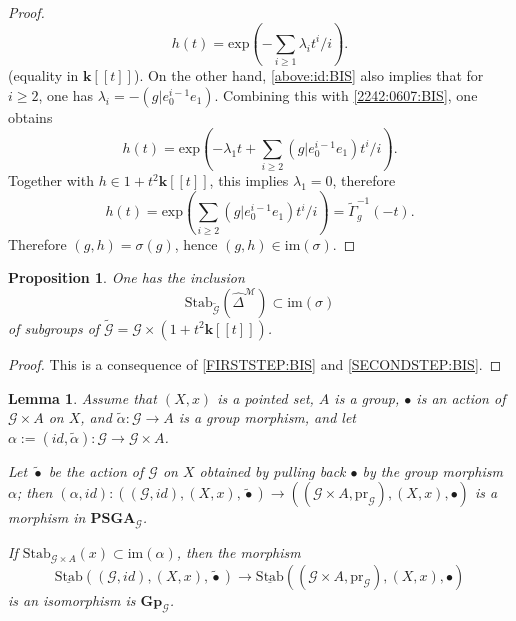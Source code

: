 \documentclass[10pt]{amsart}
\newtheorem{lem}[thm]{Lemma}
\newtheorem{prop}[thm]{Proposition}
\numberwithin{equation}{subsection}
\begin{document}
\begin{proof}
\begin{equation}\label{2242:0607:BIS}
h(t)=\mathrm{exp}(-\sum_{i\geq 1}\lambda_it^i/i). 
\end{equation}
(equality in $\mathbf k[[t]]$). On the other hand, \eqref{above:id:BIS} also implies that for $i\geq2$, one has $\lambda_i=-(g|e_0^{i-1}e_1)$. 
Combining this with \eqref{2242:0607:BIS}, one obtains  
$$
h(t)=\mathrm{exp}(-\lambda_1t+\sum_{i\geq 2}(g|e_0^{i-1}e_1)t^i/i). 
$$
Together with $h\in 1+t^2\mathbf k[[t]]$, this implies $\lambda_1=0$, therefore  
$$
h(t)=\mathrm{exp}(\sum_{i\geq 2}(g|e_0^{i-1}e_1)t^i/i)=\tilde\Gamma_g^{-1}(-t). 
$$
Therefore $(g,h)=\sigma(g)$, hence $(g,h)\in\mathrm{im}(\sigma)$. 
\end{proof}

\begin{prop}\label{prop:incl:1510}
One has the inclusion 
$$
\mathrm{Stab}_{\tilde{\mathcal G}}(\hat\Delta^{\mathcal M})\subset \mathrm{im}(\sigma)
$$
of subgroups of $\tilde{\mathcal G}=\mathcal G\times (1+t^2\mathbf k[[t]])$. 
\end{prop}

\begin{proof}
This is a consequence of \eqref{FIRSTSTEP:BIS} and \eqref{SECONDSTEP:BIS}.     
\end{proof}

\begin{lem}\label{lem:general:nonsense}
    Assume that $(X,x)$ is a pointed set, $A$ is a group, $\bullet$ is an action of $\mathcal G\times A$ on $X$, and $\tilde\alpha : \mathcal G\to A$
    is a group morphism, and let $\alpha:=(id,\tilde\alpha) : \mathcal G\to\mathcal G\times A$. 

    Let $\tilde\bullet$ be the action of 
    $\mathcal G$ on $X$ obtained by pulling back $\bullet$ by the group morphism $\alpha$; then $(\alpha,id) : ((\mathcal G,id),(X,x),\tilde\bullet)
    \to ((\mathcal G\times A,\mathrm{pr}_{\mathcal G}),(X,x),\bullet)$ is a morphism in  $\mathbf{PSGA}_{\mathcal G}$.

If $\mathrm{Stab}_{\mathcal G\times A}(x)\subset \mathrm{im}(\alpha)$, then the morphism 
\begin{equation}\label{mor:stab:stab}
\underline{\mathrm{Stab}}((\mathcal G,id),(X,x),\tilde\bullet)
\to\underline{\mathrm{Stab}}((\mathcal G\times A,\mathrm{pr}_{\mathcal G}),(X,x),\bullet)
\end{equation}
is an isomorphism is $\mathbf{Gp}_{\mathcal G}$.     
\end{lem}
\end{document}

